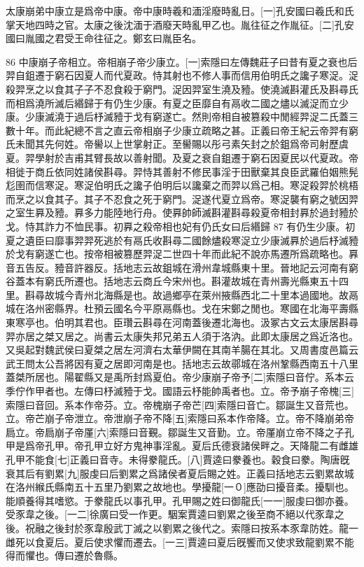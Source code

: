 太康崩弟中康立是爲帝中康。帝中康時羲和湎淫廢時亂日。[一]孔安國曰羲氏和氏掌天地四時之官。太康之後沈湎于酒廢天時亂甲乙也。胤往征之作胤征。[二]孔安國曰胤國之君受王命往征之。鄭玄曰胤臣名。

86
中康崩子帝相立。帝相崩子帝少康立。[一]索隱曰左傳魏莊子曰昔有夏之衰也后羿自鉏遷于窮石因夏人而代夏政。恃其射也不修人事而信用伯明氏之讒子寒浞。浞殺羿烹之以食其子子不忍食殺于窮門。浞因羿室生澆及豷。使澆滅斟灌氏及斟尋氏而相爲澆所滅后緡歸于有仍生少康。有夏之臣靡自有鬲收二國之燼以滅浞而立少康。少康滅澆于過后杼滅豷于戈有窮遂亡。然則帝相自被篡殺中閒經羿浞二氏蓋三數十年。而此紀總不言之直云帝相崩子少康立疏略之甚。正義曰帝王紀云帝羿有窮氏未聞其先何姓。帝嚳以上世掌射正。至嚳賜以彤弓素矢封之於鉏爲帝司射歷虞夏。羿學射於吉甫其臂長故以善射聞。及夏之衰自鉏遷于窮石因夏民以代夏政。帝相徙于商丘依同姓諸侯斟尋。羿恃其善射不修民事淫于田獸棄其良臣武羅伯姻熊髡尨圉而信寒浞。寒浞伯明氏之讒子伯明后以讒棄之而羿以爲己相。寒浞殺羿於桃梧而烹之以食其子。其子不忍食之死于窮門。浞遂代夏立爲帝。寒浞襲有窮之號因羿之室生奡及豷。奡多力能陸地行舟。使奡帥師滅斟灌斟尋殺夏帝相封奡於過封豷於戈。恃其詐力不恤民事。初奡之殺帝相也妃有仍氏女曰后緡歸
87
有仍生少康。初夏之遺臣曰靡事羿羿死逃於有鬲氏收斟尋二國餘燼殺寒浞立少康滅奡於過后杼滅豷於戈有窮遂亡也。按帝相被篡歷羿浞二世四十年而此紀不說亦馬遷所爲疏略也。奡音五告反。豷音許器反。括地志云故鉏城在滑州韋城縣東十里。晉地記云河南有窮谷蓋本有窮氏所遷也。括地志云商丘今宋州也。斟灌故城在青州壽光縣東五十四里。斟尋故城今青州北海縣是也。故過鄉亭在萊州掖縣西北二十里本過國地。故鬲城在洛州密縣界。杜預云國名今平原鬲縣也。戈在宋鄭之閒也。寒國在北海平壽縣東寒亭也。伯明其君也。臣瓚云斟尋在河南蓋後遷北海也。汲冢古文云太康居斟尋羿亦居之桀又居之。尚書云太康失邦兄弟五人須于洛汭。此即太康居之爲近洛也。又吳起對魏武侯曰夏桀之居左河濟右太華伊闕在其南羊腸在其北。又周書度邑篇云武王問太公吾將因有夏之居即河南是也。括地志云故鄩城在洛州鞏縣西南五十八里蓋桀所居也。陽翟縣又是禹所封爲夏伯。帝少康崩子帝予[二]索隱曰音佇。系本云季佇作甲者也。左傳曰杼滅豷于戈。國語云杼能帥禹者也。立。帝予崩子帝槐[三]索隱曰音回。系本作帝芬。立。帝槐崩子帝芒[四]索隱曰音亡。鄒誕生又音荒也。立。帝芒崩子帝泄立。帝泄崩子帝不降[五]索隱曰系本作帝降。立。帝不降崩弟帝扃立。帝扃崩子帝厪[六]索隱曰音覲。鄒誕生又音勤。立。帝厪崩立帝不降之子孔甲是爲帝孔甲。帝孔甲立好方鬼神事淫亂。夏后氏德衰諸侯畔之。天降龍二有雌雄孔甲不能食[七]正義曰音寺。未得豢龍氏。[八]賈逵曰豢養也。穀食曰豢。陶唐旣衰其后有劉累[九]服虔曰后劉累之爲諸侯者夏后賜之姓。正義曰括地志云劉累故城在洛州緱氏縣南五十五里乃劉累之故地也。學擾龍[一０]應劭曰擾音柔。擾馴也。能順養得其嗜慾。于豢龍氏以事孔甲。孔甲賜之姓曰御龍氏[一一]服虔曰御亦養。受豕韋之後。[一二]徐廣曰受一作更。駰案賈逵曰劉累之後至商不絕以代豕韋之後。祝融之後封於豕韋殷武丁滅之以劉累之後代之。索隱曰按系本豕韋防姓。龍一雌死以食夏后。夏后使求懼而遷去。[一三]賈逵曰夏后旣饗而又使求致龍劉累不能得而懼也。傳曰遷於魯縣。

